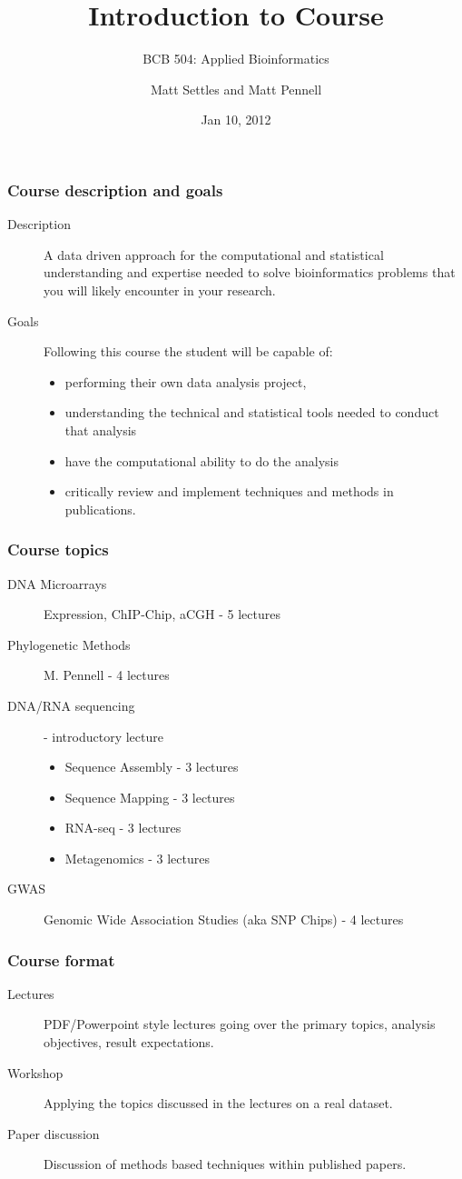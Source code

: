 \documentclass[pdf]{beamer}
\title[Course Introduction]{Introduction to Course\\}
\subtitle{BCB 504: Applied Bioinformatics\\}
\author[Matt Settles]{Matt Settles and Matt Pennell}
\institute{University of Idaho\\ Bioinformatics and Computational Biology Program}
\date{Jan 10, 2012}
\begin{document}
\begin{frame}
\titlepage
\end{frame}


\begin{frame}
	\frametitle{Course description and goals}
	\begin{description}
	\item[Description]
	A data driven approach for the computational and statistical understanding and expertise needed to solve bioinformatics problems that you will likely encounter in your research. 
	\item[Goals]
	Following this course the student will be capable of:
	\begin{itemize} 
		\item performing their own data analysis project, 
		\item understanding the technical and statistical tools needed to conduct that analysis
		\item have the computational ability to do the analysis
		\item critically review and implement techniques and methods in publications.
	\end{itemize}
	\end{description}
\end{frame}

\begin{frame}
	\frametitle{Course topics}
	\begin{description}
		\item[DNA Microarrays] Expression, ChIP-Chip, aCGH - 5 lectures
		\item[Phylogenetic Methods] M. Pennell - 4 lectures
		\item[DNA/RNA sequencing] - introductory lecture 
		\begin{itemize}
			\item Sequence Assembly - 3 lectures
			\item Sequence Mapping - 3 lectures
			\item RNA-seq - 3 lectures
			\item Metagenomics - 3 lectures
		\end{itemize}
		\item[GWAS] Genomic Wide Association Studies (aka SNP Chips) - 4 lectures
	\end{description}
\end{frame}

\begin{frame}
	\frametitle{Course format}
	\begin{description}
		\item[Lectures] PDF/Powerpoint style lectures going over the primary topics, analysis objectives, result expectations.
		\item[Workshop] Applying the topics discussed in the lectures on a real dataset.
		\item[Paper discussion] Discussion of methods based techniques within published papers.
	\end{description}
\end{frame}	
\end{document}
